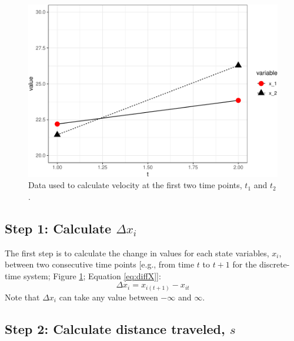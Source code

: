 \documentclass[12pt,twoside,openany]{reedthesis}
\begin{document}
\begin{figure}[bth]

{\centering \includegraphics[width=0.85\linewidth]{_myDissertation_files/figure-latex/sysEx2-1} 

}

\caption{Data used to calculate velocity at the first two time points, $t_1$ and $t_2$.}\label{fig:sysEx2}
\end{figure}
\hypertarget{step-1-calculate-delta-x_i}{%
\subsection{\texorpdfstring{Step 1: Calculate \(\Delta x_i\)}{Step 1: Calculate \textbackslash Delta x\_i}}\label{step-1-calculate-delta-x_i}}

The first step is to calculate the change in values for each state variables, \(x_i\), between two consecutive time points {[}e.g., from time \(t\) to \(t+1\) for the discrete-time system; Figure \ref{fig:sysEx2}; Equation \eqref{eq:diffX}{]}:
\begin{equation}
\Delta x_i = x_{i(t+1)} - x_{it} 
\label{eq:diffX}
\end{equation}
Note that \(\Delta x_i\) can take any value between \(-\infty\) and \(\infty\).

\hypertarget{step-2-calculate-distance-traveled-s}{%
\subsection{\texorpdfstring{Step 2: Calculate distance traveled, \(s\)}{Step 2: Calculate distance traveled, s}}\label{step-2-calculate-distance-traveled-s}}
\end{document}
